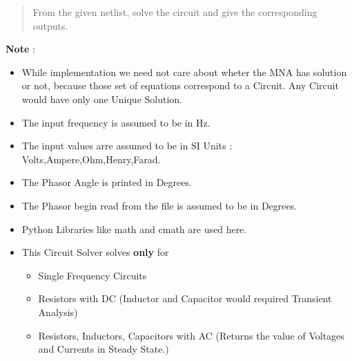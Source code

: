\documentclass[11pt]{article}
\begin{document}
\begin{quote}
From the given netlist, solve the circuit and give the corresponding
outputs.
\end{quote}

    \textbf{Note} :
    \begin{itemize}
        \item While implementation we need not care about wheter the
MNA has solution or not, because those set of equations correspond to a
Circuit. Any Circuit would have only one Unique Solution.
        \item The input
frequency is assumed to be in Hz.
\item The input values arre assumed to be
in SI Units : Volts,Ampere,Ohm,Henry,Farad.
\item The Phasor Angle is
printed in Degrees.
\item The Phasor begin read from the file is assumed to
be in Degrees.
\item Python Libraries like math and cmath are used here.
\item This Circuit Solver solves \textbf{only} for 
\begin{itemize}
    \item Single Frequency Circuits
    \item Resistors with DC (Inductor and Capacitor would required Transient
Analysis)
\item Resistors, Inductors, Capacitors with AC (Returns the value
of Voltages and Currents in Steady State.)
\end{itemize} 
    \end{itemize}
\end{document}
